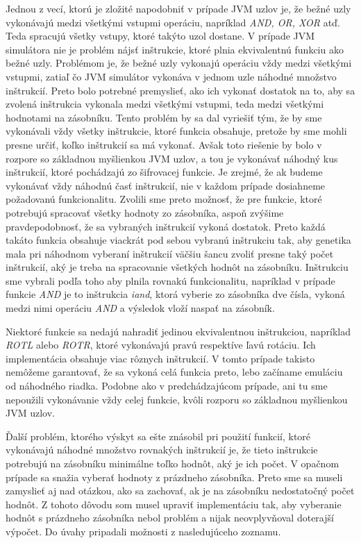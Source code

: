 Jednou z vecí, ktorú je zložité napodobniť v prípade JVM uzlov je, že bežné uzly vykonávajú medzi všetkými vstupmi operáciu, napríklad \textit{AND, OR, XOR} atď. Teda spracujú všetky vstupy, ktoré takýto uzol dostane. V prípade JVM simulátora nie je problém nájsť inštrukcie, ktoré plnia ekvivalentnú funkciu ako bežné uzly. Problémom je, že bežné uzly vykonajú operáciu vždy medzi všetkými vstupmi, zatiaľ čo JVM simulátor vykonáva v jednom uzle náhodné množstvo inštrukcií. Preto bolo potrebné premyslieť, ako ich vykonať dostatok na to, aby sa zvolená inštrukcia vykonala medzi všetkými vstupmi, teda medzi všetkými hodnotami na zásobníku. Tento problém by sa dal vyriešiť tým, že by sme vykonávali vždy všetky inštrukcie, ktoré funkcia obsahuje, pretože by sme mohli presne určiť, koľko inštrukcií sa má vykonať. Avšak toto riešenie by bolo v rozpore so základnou myšlienkou JVM uzlov, a tou je vykonávať náhodný kus inštrukcií, ktoré pochádzajú zo šifrovacej funkcie. Je zrejmé, že ak budeme vykonávať vždy náhodnú časť inštrukcií, nie v každom prípade dosiahneme požadovanú funkcionalitu. Zvolili sme preto možnosť, že pre funkcie, ktoré potrebujú spracovať všetky hodnoty zo zásobníka, aspoň zvýšime pravdepodobnosť, že sa vybraných inštrukcií vykoná dostatok. Preto každá takáto funkcia obsahuje viackrát pod sebou vybranú inštrukciu tak, aby genetika mala pri náhodnom vyberaní inštrukcií väčšiu šancu zvoliť presne taký počet inštrukcií, aký je treba na spracovanie všetkých hodnôt na zásobníku. Inštrukciu sme vybrali podľa toho aby plnila rovnakú funkcionalitu, napríklad v prípade funkcie \textit{AND} je to inštrukcia \textit{iand}, ktorá vyberie zo zásobníka dve čísla, vykoná medzi nimi operáciu \textit{AND} a výsledok vloží naspať na zásobník. 

Niektoré funkcie sa nedajú nahradiť jedinou ekvivalentnou inštrukciou, napríklad \textit{ROTL} alebo \textit{ROTR}, ktoré vykonávajú pravú respektíve ľavú rotáciu. Ich implementácia obsahuje viac rôznych inštrukcií. V tomto prípade takisto nemôžeme garantovať, že sa vykoná celá funkcia preto, lebo začíname emuláciu od náhodného riadka. Podobne ako v predchádzajúcom prípade, ani tu sme nepoužili vykonávanie vždy celej funkcie, kvôli rozporu so základnou myšlienkou JVM uzlov.

Ďalší problém, ktorého výskyt sa ešte znásobil pri použití funkcií, ktoré vykonávajú náhodné množstvo rovnakých inštrukcií je, že tieto inštrukcie potrebujú na zásobníku minimálne toľko hodnôt, aký je ich počet. V opačnom prípade sa snažia vyberať hodnoty z prázdneho zásobníka. Preto sme sa museli zamyslieť aj nad otázkou, ako sa zachovať, ak je na zásobníku nedostatočný počet hodnôt. Z tohoto dôvodu som musel upraviť implementáciu tak, aby vyberanie hodnôt s prázdneho zásobníka nebol problém a nijak neovplyvňoval doterajší výpočet. Do úvahy pripadali možnosti z nasledujúceho zoznamu.

